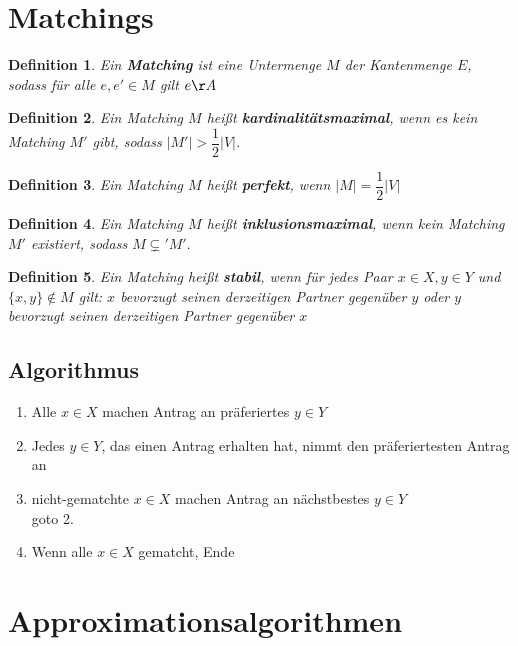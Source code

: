 \documentclass[12pt]{article}
\numberwithin{equation}{subsection}
\newtheorem{df}{Definition}
\begin{document}
\section{Matchings}
\begin{df}
	Ein \textbf{Matching} ist eine Untermenge $M$ der Kantenmenge $E$, sodass für alle $e,e'\in M$ gilt $e\AA$
\end{df}
\begin{df}
	Ein Matching $M$ heißt \textbf{kardinalitätsmaximal}, wenn es kein Matching $M'$ gibt, sodass $|M'|>\dfrac{1}{2}|V|$.
\end{df}
\begin{df}
	Ein Matching $M$ heißt \textbf{perfekt}, wenn $|M|=\dfrac{1}{2}|V|$
\end{df}
\begin{df}
	Ein Matching $M$ heißt \textbf{inklusionsmaximal}, wenn kein Matching $M'$ existiert, sodass $M\subsetneq'M'.$
\end{df}
\begin{df}
	Ein Matching heißt \textbf{stabil}, wenn für jedes Paar $x\in X, y\in Y$ und $\{x,y\}\notin M$ gilt: $x$ bevorzugt seinen derzeitigen Partner gegenüber $y$ oder $y$ bevorzugt seinen derzeitigen Partner gegenüber $x$
\end{df}
\subsection{Algorithmus}
\begin{enumerate}
	\item Alle $x\in X$ machen Antrag an präferiertes $y\in Y$
	\item Jedes $y\in Y$, das einen Antrag erhalten hat, nimmt den präferiertesten Antrag an
	\item nicht-gematchte $x\in X$ machen Antrag an nächstbestes $y\in Y$\\
	\to goto 2.
	\item Wenn alle $x\in X$ gematcht, Ende
\end{enumerate}
\section{Approximationsalgorithmen}
\end{document}
